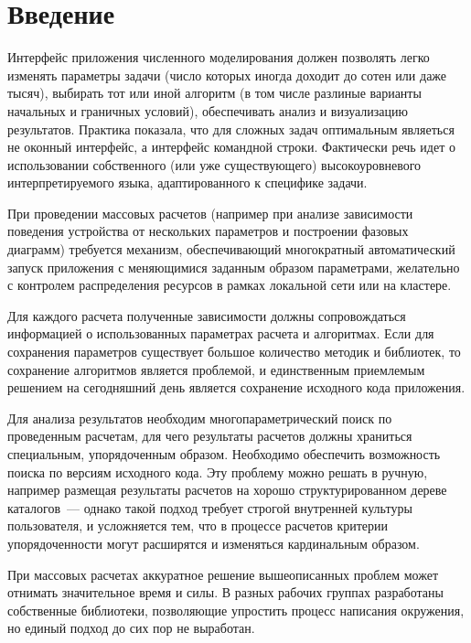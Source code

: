 \section{Введение}

Интерфейс приложения численного моделирования должен позволять
легко изменять параметры задачи (число которых иногда доходит до сотен или даже тысяч),
выбирать тот или иной алгоритм (в том числе разлиные варианты начальных и граничных условий),
обеспечивать анализ и визуализацию
результатов. Практика показала, что для сложных задач оптимальным
являеться не оконный интерфейс, а интерфейс командной
строки. Фактически речь идет о использовании собственного (или уже
существующего) высокоуровневого интерпретируемого языка,
адаптированного к специфике задачи.

При проведении массовых расчетов (например при анализе зависимости поведения устройства от 
нескольких параметров и построении фазовых диаграмм) требуется механизм, обеспечивающий
многократный автоматический запуск приложения с меняющимися заданным образом параметрами, 
желательно с контролем распределения ресурсов в рамках локальной сети или на кластере.

Для каждого расчета полученные зависимости должны сопровождаться
информацией о использованных параметрах расчета и алгоритмах. Если для
сохранения параметров существует большое количество методик и
библиотек, то сохранение алгоритмов является проблемой, и единственным
приемлемым решением на сегодняшний день является сохранение исходного
кода приложения.

Для анализа результатов необходим многопараметрический поиск по
проведенным расчетам, для чего результаты расчетов должны храниться
специальным, упорядоченным образом. Необходимо обеспечить возможность
поиска по версиям исходного кода. Эту проблему можно решать в ручную,
например размещая результаты расчетов на хорошо структурированном дереве
каталогов~--- однако такой подход требует строгой внутренней культуры пользователя, и
усложняется тем, что в процессе расчетов критерии упорядоченности могут
расширятся и изменяться кардинальным образом.   

При массовых расчетах аккуратное решение вышеописанных проблем может отнимать значительное время и силы. 
В разных рабочих группах
разработаны собственные библиотеки, позволяющие упростить процесс
написания окружения, но единый подход до сих пор не выработан.

